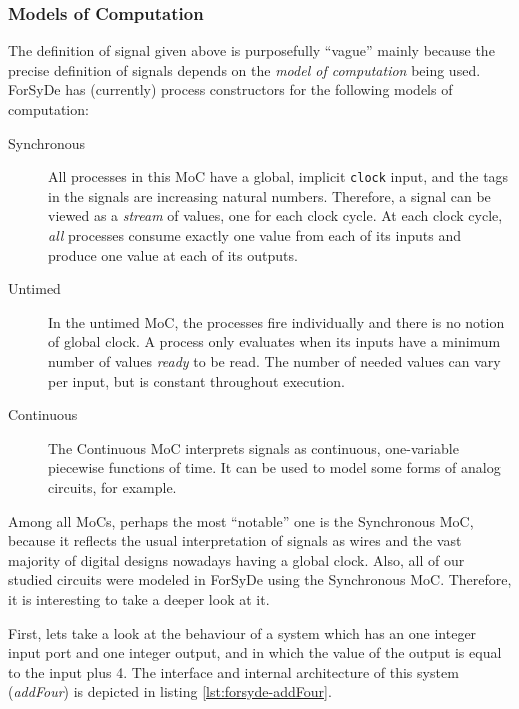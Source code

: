         \subsubsection{Models of Computation}
        \label{subsubsec:forsyde-mocs}
            The definition of signal given above is purposefully ``vague'' mainly because the
            precise definition of signals depends on the \emph{model of computation} being used.
            ForSyDe has (currently) process constructors for the following models of computation:

            \begin{description}
                \item[Synchronous] All processes in this MoC have a global, implicit \texttt{clock}
                    input, and the tags in the signals are increasing natural numbers. Therefore, a
                    signal can be viewed as a \emph{stream} of values, one for each clock cycle. At
                    each clock cycle, \emph{all} processes consume exactly one value from each of
                    its inputs and produce one value at each of its outputs.

                \item[Untimed] In the untimed MoC, the processes fire individually and there is no
                    notion of global clock. A process only evaluates when its inputs have a minimum
                    number of values \emph{ready} to be read. The number of needed values can vary
                    per input, but is constant throughout execution.

                \item[Continuous] The Continuous MoC interprets signals as continuous, one-variable
                    piecewise functions of time. It can be used to model some forms of analog
                    circuits, for example.
            \end{description}

            \label{ref:forsyde-moc-synch}
            Among all MoCs, perhaps the most ``notable'' one is the Synchronous MoC, because it
            reflects the usual interpretation of signals as wires and the vast majority of digital
            designs nowadays having a global clock. Also, all of our studied circuits were modeled
            in ForSyDe using the Synchronous MoC. Therefore, it is interesting to take a deeper look
            at it.

            First, lets take a look at the behaviour of a system which has an one integer input port
            and one integer output, and in which the value of the output is equal to the input plus
            4. The interface and internal architecture of this system (\emph{addFour}) is depicted
            in listing \ref{lst:forsyde-addFour}.

